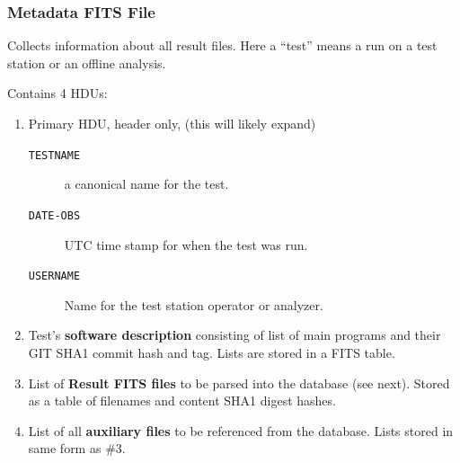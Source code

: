 \documentclass[xcolor=dvipsnames]{beamer}
\begin{document}
\begin{frame}
  \frametitle{Metadata FITS File} 

  Collects information about all result files.  Here a ``test'' means
  a run on a test station or an offline analysis.  

  Contains 4 HDUs:

  \begin{enumerate}
  \item Primary HDU, header only, (this will likely expand)
    \begin{description}
    \item[\texttt{TESTNAME}] a canonical name for the test.
    \item[\texttt{DATE-OBS}] UTC time stamp for when the test was run.
    \item[\texttt{USERNAME}] Name for the test station operator or analyzer.
    \end{description}
  \item Test's \textbf{software description} consisting of list of main
    programs and their GIT SHA1 commit hash and tag.  Lists are stored
    in a FITS table.
  \item List of \textbf{Result FITS files} to be parsed into the database (see next).
    Stored as a table of filenames and content SHA1 digest hashes.
  \item List of all \textbf{auxiliary files} to be referenced from the
    database.  Lists stored in same form as \#3.
  \end{enumerate}

\end{frame}
\end{document}
